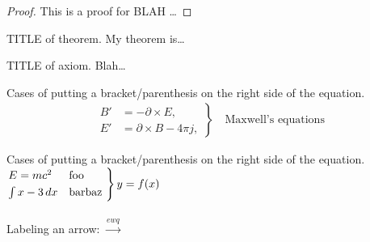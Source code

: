 \begin{proof}
This is a proof for BLAH \dots
\end{proof}




\begin{theorem}{TITLE of theorem.}
My theorem is\dots
\end{theorem}



\begin{axiom}{TITLE of axiom.}
Blah\dots
\end{axiom}



Cases of putting a bracket/parenthesis on the right side of the equation.
\begin{gather*}
	\left.\begin{aligned}
	B'&=-\partial \times E,\\
	E'&=\partial \times B - 4\pi j,
	\end{aligned}
	\right\}
	\quad\text{Maxwell's equations}
\end{gather*}


Cases of putting a bracket/parenthesis on the right side of the equation.\\
$\begin{rcases*}
	E = m c^2 & foo \\
	\int x-3\, dx & barbaz
\end{rcases*} y=f(x)$
\ \\
\ \\

Labeling an arrow: $\xrightarrow{ewq}$
